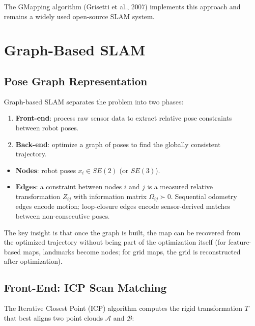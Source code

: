\documentclass[11pt,a4paper]{article}
\theoremstyle{definition}
\theoremstyle{plain}
\theoremstyle{remark}
\begin{document}
The GMapping algorithm (Grisetti et al., 2007) implements this approach and remains a widely used open-source SLAM system.

\section{Graph-Based SLAM}

\subsection{Pose Graph Representation}

Graph-based SLAM separates the problem into two phases:

\begin{enumerate}
    \item \textbf{Front-end}: process raw sensor data to extract relative pose constraints between robot poses.
    \item \textbf{Back-end}: optimize a graph of poses to find the globally consistent trajectory.
\end{enumerate}

\begin{tcolorbox}[colback=blue!5!white,colframe=blue!75!black,title=\textbf{Pose Graph}]
\begin{itemize}
    \item \textbf{Nodes}: robot poses $x_i \in SE(2)$ (or $SE(3)$).
    \item \textbf{Edges}: a constraint between nodes $i$ and $j$ is a measured relative transformation $Z_{ij}$ with information matrix $\Omega_{ij} \succ 0$. Sequential odometry edges encode motion; loop-closure edges encode sensor-derived matches between non-consecutive poses.
\end{itemize}
\end{tcolorbox}

The key insight is that once the graph is built, the map can be recovered from the optimized trajectory without being part of the optimization itself (for feature-based maps, landmarks become nodes; for grid maps, the grid is reconstructed after optimization).

\subsection{Front-End: ICP Scan Matching}

The Iterative Closest Point (ICP) algorithm computes the rigid transformation $T$ that best aligns two point clouds $\mathcal{A}$ and $\mathcal{B}$:
\end{document}
